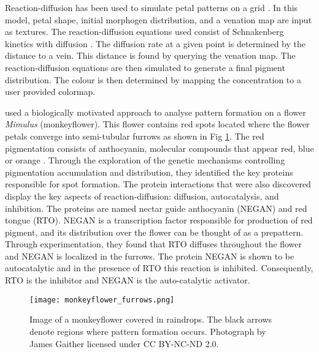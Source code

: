 Reaction-diffusion has been used to simulate petal patterns on a grid \citep{Zhou2007}. In this model, petal shape, initial morphogen distribution, and a venation map are input as textures. The reaction-diffusion equations used consist of Schnakenberg kinetics with diffusion \citep{schnakenberg1979}. The diffusion rate at a given point is determined by the distance to a vein. This distance is found by querying the venation map. The reaction-diffusion equations are then simulated to generate a final pigment distribution. The colour is then determined by mapping the concentration to a user provided colormap.

\citep{Yuan2019} used a biologically motivated approach to analyse pattern formation on a flower \textit{Mimulus} (monkeyflower). This flower contains red spots located where the flower petals converge into semi-tubular furrows as shown in Fig \ref{fig:monkeyflower_real}. The red pigmentation consists of anthocyanin, molecular compounds that appear red, blue or orange \citep{bayer1966}. Through the exploration of the genetic mechanisms controlling pigmentation accumulation and distribution, they identified the key proteins responsible for spot formation. The protein interactions that were also discovered display the key aspects of reaction-diffusion: diffusion, autocatalysis, and inhibition. The proteins are named nectar guide anthocyanin (NEGAN) and red tongue (RTO). NEGAN is a transcription factor responsible for production of red pigment, and its distribution over the flower can be thought of as a prepattern. Through experimentation, they found that RTO diffuses throughout the flower and NEGAN is localized in the furrows. The protein NEGAN is shown to be autocatalytic and in the presence of RTO this reaction is inhibited. Consequently, RTO is the inhibitor and NEGAN is the auto-catalytic activator.

\begin{figure}[ht]
	\centering
	\texttt{[image: monkeyflower\_furrows.png]}
	\caption{Image of a monkeyflower covered in raindrops. The black arrows denote regions where pattern formation occurs. Photograph by James Gaither licensed under CC BY-NC-ND 2.0.}
	\label{fig:monkeyflower_real}
\end{figure}

